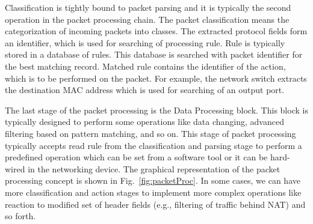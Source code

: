Classification is tightly bound to packet parsing and it is typically the second operation in the packet processing chain. 
The packet classification means the categorization of incoming packets into classes. 
The extracted protocol fields form an identifier, which is used for searching of processing rule. 
Rule is typically stored in a database of rules. 
This database is searched with packet identifier for the best matching record. 
Matched rule contains the identifier of the action, which is to be performed on the packet. 
For example, the network switch extracts the destination MAC address which is used for searching of an output port. 

The last stage of the packet processing is the Data Processing block. This block is typically designed to perform some operations like data changing, 
advanced filtering based on pattern matching, and so on. 
This stage of packet processing typically accepts read rule from the classification and 
parsing stage to perform a predefined operation which can be set from a software tool or it can be hard-wired in the networking device. 
The graphical representation of 
the packet processing concept is shown in Fig.~\ref{fig:packetProc}. 
In some cases, we can have more classification and action stages to implement more complex operations
like reaction to modified set of header fields (e.g., filtering of traffic behind NAT) and so forth.

